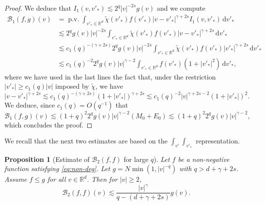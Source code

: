 \documentclass[11pt]{article}
\theoremstyle{plain}
\newtheorem{prop}[thm]{Proposition}
\theoremstyle{definition}
\numberwithin{equation}{section}
\newcommand{\R}{\mathbb R}
\newcommand{\dd} {\, \mathrm{d}}
\DeclareMathOperator{\PV}{p.v.}
\let\A N
\begin{document}
\begin{proof}
We deduce that $I_1(v,v'_*) \lesssim 2^q |v|^{-2s}g(v)$ and we compute
\begin{align*}
\mathcal{B}_1(f,g)(v) & = \PV \int_{v'_* \in \R^d} \tilde \chi(v'_*) f(v'_*) |v-v'_*|^{\gamma+2s} I_1(v,v'_*) \dd v'_* \\
& \lesssim 2^q g(v) |v|^{-2s} \int_{v'_* \in
\R^d} \tilde \chi(v'_*) f(v'_*)
|v-v'_*|^{\gamma+2s} \dd v'_* \\
& \lesssim c_1(q)^{-(\gamma+2s)} 2^q g(v) |v|^{-2s} \int_{v'_* \in
\R^d} \tilde \chi(v'_*) f(v'_*) |v'_*|^{\gamma+2s} \dd v'_* \\
& \lesssim c_1(q)^{-2} 2^q g(v) |v|^{\gamma-2} \int_{v'_* \in \R^d} f(v'_*) (1+|v'_*|^2) \dd v'_*,
\end{align*}
where we have used in the last lines the fact that, under the
restriction $|v'_*| \ge c_1(q) |v|$ imposed by $\tilde \chi$, we have
\[
|v-v'_*|^{\gamma+2s} \lesssim c_1(q)^{-(\gamma+2s)} (1+|v'_*|)^{\gamma+2s}
\lesssim c_1(q)^{-2} |v|^{\gamma+2s-2} (1+|v'_*|)^{2}.
\]
We deduce, since $c_1(q) = O(q^{-1})$ that
\begin{equation*}
\mathcal{B}_1(f,g)(v) \lesssim (1+q)^2 2^q g(v) |v|^{\gamma-2} (M_0 + E_0)
\lesssim (1+q)^2 2^q g(v) |v|^{\gamma-2},
\end{equation*}
which concludes the proof.
\end{proof}

We recall that the next two estimates are based on the $\int_{v'}
\int_{v'_*}$ representation.

\begin{prop}[Estimate of {$\mathcal{B}_2(f,f)$} for large
$q$] \label{prop:B2} Let $f$ be a non-negative function satisfying \eqref{eq:non-deg}. Let
$g = \A \min(1,|v|^{-q})$ with $q> d+ \gamma +2s$. Assume $f \leq g$ for all $v \in \R^d$. Then for
$|v| \ge 2$,
\[ \mathcal{B}_2 (f,f)(v)
\lesssim \frac{|v|^{\gamma}}{q-(d+\gamma + 2s)} g(v).\]
\end{prop}
\end{document}
